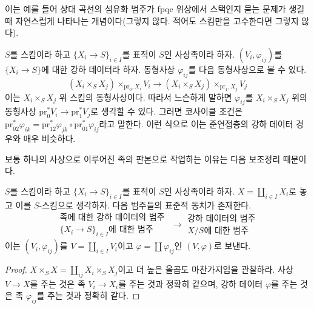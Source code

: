 \noindent
이는 예를 들어 상대 곡선의 섬유화 범주가 fpqc 위상에서 스택인지 묻는
문제가 생길 때 자연스럽게 나타나는 개념이다(그렇지 않다. 적어도
스킴만을 고수한다면 그렇지 않다).

\begin{remark}
\label{remark-easier-family}
$S$를 스킴이라 하고 $\{X_i \to S\}_{i \in I}$를 표적이 $S$인
사상족이라 하자. $(V_i, \varphi_{ij})$를 $\{X_i \to S\}$에 대한
강하 데이터라 하자. 동형사상 $\varphi_{ij}$를 다음 동형사상으로
볼 수 있다.
$$
(X_i \times_S X_j) \times_{\text{pr}_0, X_i} V_i
\longrightarrow
(X_i \times_S X_j) \times_{\text{pr}_1, X_j} V_j
$$
이는 $X_i \times_S X_j$ 위 스킴의 동형사상이다. 따라서 느슨하게
말하면 $\varphi_{ij}$를 $X_i \times_S X_j$ 위의 동형사상
$\text{pr}_0^*V_i \to \text{pr}_1^*V_j$로 생각할 수 있다.
그러면 코사이클 조건은
$\text{pr}_{02}^*\varphi_{ik} =
\text{pr}_{12}^*\varphi_{jk} \circ \text{pr}_{01}^*\varphi_{ij}$라고
말한다. 이런 식으로 이는 준연접층의 강하 데이터 경우와 매우 비슷하다.
\end{remark}

\noindent
보통 하나의 사상으로 이루어진 족의 판본으로 작업하는 이유는 다음
보조정리 때문이다.

\begin{lemma}
\label{lemma-family-is-one}
$S$를 스킴이라 하고 $\{X_i \to S\}_{i \in I}$를 표적이 $S$인
사상족이라 하자. $X = \coprod_{i \in I} X_i$로 놓고 이를 $S$-스킴으로
생각하자. 다음 범주들의 표준적 동치가 존재한다.
$$
\begin{matrix}
\text{족에 대한 강하 데이터의 범주 } \\
\{X_i \to S\}_{i \in I}\text{에 대한 범주}
\end{matrix}
\longrightarrow
\begin{matrix}
\text{강하 데이터의 범주} \\
X/S\text{에 대한 범주}
\end{matrix}
$$
이는 $(V_i, \varphi_{ij})$를 $V = \coprod_{i\in I} V_i$이고
$\varphi = \coprod \varphi_{ij}$인 $(V, \varphi)$로 보낸다.
\end{lemma}

\begin{proof}
$X \times_S X = \coprod_{ij} X_i \times_S X_j$이고 더 높은 올곱도
마찬가지임을 관찰하라. 사상 $V \to X$를 주는 것은 족
$V_i \to X_i$를 주는 것과 정확히 같으며, 강하 데이터 $\varphi$를
주는 것은 족 $\varphi_{ij}$를 주는 것과 정확히 같다.
\end{proof}

